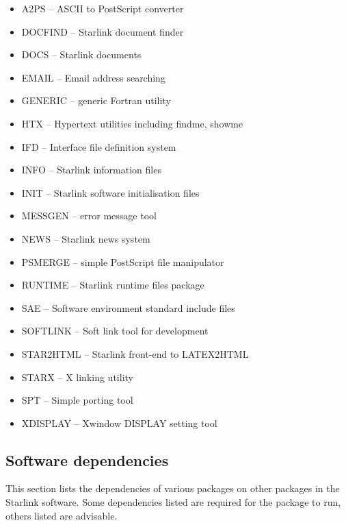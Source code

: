 \documentclass[twoside,11pt]{article}
\newcommand{\xlabel}[1]{}
\renewcommand{\_}{\texttt{\symbol{95}}}
\begin{document}
\begin{itemize}
\item A2PS -- ASCII to PostScript converter
\item DOCFIND -- Starlink document finder
\item DOCS -- Starlink documents
\item EMAIL -- Email address searching
\item GENERIC -- generic Fortran utility
\item HTX -- Hypertext utilities including findme, showme
\item IFD -- Interface file definition system
\item INFO -- Starlink information files
\item INIT  -- Starlink software initialisation files
\item MESSGEN  -- error message tool
\item NEWS -- Starlink news system
\item PSMERGE -- simple PostScript file manipulator
\item RUNTIME -- Starlink runtime files package
\item SAE -- Software environment standard include files
\item SOFTLINK -- Soft link tool for development
\item STAR2HTML -- Starlink front-end to LATEX2HTML
\item STARX -- X linking utility
\item SPT -- Simple porting tool
\item XDISPLAY -- Xwindow DISPLAY setting tool
\end{itemize}

\subsection{\xlabel{software_dependencies}Software dependencies}
\label{software_dependencies}

This section lists the dependencies of various packages on other
packages in the Starlink software.  Some dependencies listed are
required for the package to run, others listed are advisable.
\end{document}

